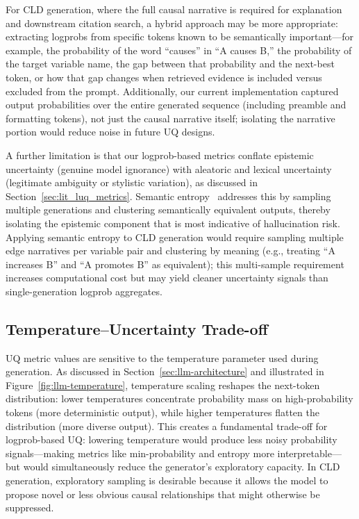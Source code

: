 For CLD generation, where the full causal narrative is required for explanation and downstream citation search, a hybrid approach may be more appropriate: extracting logprobs from specific tokens known to be semantically important---for example, the probability of the word ``causes'' in ``A causes B,'' the probability of the target variable name, the gap between that probability and the next-best token, or how that gap changes when retrieved evidence is included versus excluded from the prompt. Additionally, our current implementation captured output probabilities over the entire generated sequence (including preamble and formatting tokens), not just the causal narrative itself; isolating the narrative portion would reduce noise in future UQ designs.

A further limitation is that our logprob-based metrics conflate epistemic uncertainty (genuine model ignorance) with aleatoric and lexical uncertainty (legitimate ambiguity or stylistic variation), as discussed in Section~\ref{sec:lit_luq_metrics}. Semantic entropy~\citep{farquhar2024detecting} addresses this by sampling multiple generations and clustering semantically equivalent outputs, thereby isolating the epistemic component that is most indicative of hallucination risk. Applying semantic entropy to CLD generation would require sampling multiple edge narratives per variable pair and clustering by meaning (e.g., treating ``A increases B'' and ``A promotes B'' as equivalent); this multi-sample requirement increases computational cost but may yield cleaner uncertainty signals than single-generation logprob aggregates.

\subsection{Temperature--Uncertainty Trade-off}

UQ metric values are sensitive to the temperature parameter used during generation. As discussed in Section~\ref{sec:llm-architecture} and illustrated in Figure~\ref{fig:llm-temperature}, temperature scaling reshapes the next-token distribution: lower temperatures concentrate probability mass on high-probability tokens (more deterministic output), while higher temperatures flatten the distribution (more diverse output). This creates a fundamental trade-off for logprob-based UQ: lowering temperature would produce less noisy probability signals---making metrics like min-probability and entropy more interpretable---but would simultaneously reduce the generator's exploratory capacity. In CLD generation, exploratory sampling is desirable because it allows the model to propose novel or less obvious causal relationships that might otherwise be suppressed.

